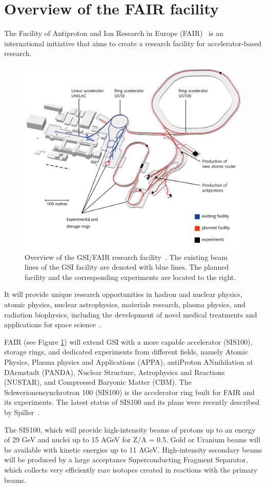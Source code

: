 
\section{Overview of the FAIR facility}
The Facility of Antiproton and Ion Research in Europe (\gls{FAIR})~\cite{fair} is an international initiative that aims to create a research facility for accelerator-based research. 

\begin{figure}[!h]
    \centering
    \includegraphics[width=0.75\columnwidth]{Chapter2/images/fair.jpg}
    \caption{Overview of the GSI/FAIR research facility~\cite{fair}. The existing beam lines of the \gls{GSI} facility are denoted with blue lines. The planned facility and the corresponding experiments are located to the right.}
    \label{fig:fair}
\end{figure}

It will provide unique research opportunities in hadron and nuclear physics, atomic physics, nuclear astrophysics, materials research, plasma physics, and radiation biophysics, including the development of novel medical treatments and applications for space science~\cite{fair1}. 
 
FAIR (see Figure \ref{fig:fair}) will extend GSI with a more capable accelerator (SIS100), storage rings, and dedicated experiments from different fields, namely Atomic Physics, Plasma physics and Applications (APPA), antiProton ANnihilation at DArmstadt (PANDA), Nuclear Structure, Astrophysics and Reactions (NUSTAR), and Compressed Baryonic Matter (\gls{CBM}). The Schwerionensynchrotron 100 (SIS100) is
the accelerator ring built for FAIR and its experiments. The latest status of SIS100 and its plans were recently described by Spiller~\cite{Spiller_2020}.

The SIS100, which will provide high-intensity beams of protons up
to an energy of 29 GeV and nuclei up to 15 AGeV for Z/A = 0.5. Gold or Uranium beams will be available with kinetic energies up to 11 AGeV. High-intensity secondary beams will be produced by a large acceptance Superconducting Fragment Separator, which collects very efficiently rare isotopes created in reactions with the primary beams. 